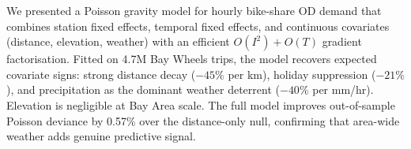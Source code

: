 \documentclass[conference,10pt]{IEEEtran}
\begin{document}
We presented a Poisson gravity model for hourly bike-share OD demand
that combines station fixed effects, temporal fixed effects, and
continuous covariates (distance, elevation, weather) with an efficient
$O(I^2)+O(T)$ gradient factorisation.  Fitted on 4.7M Bay Wheels trips,
the model recovers expected covariate signs: strong distance decay
($-45\%$ per km), holiday suppression ($-21\%$), and precipitation as
the dominant weather deterrent ($-40\%$ per mm/hr).  Elevation is
negligible at Bay Area scale.  The full model improves out-of-sample
Poisson deviance by 0.57\% over the distance-only null, confirming
that area-wide weather adds genuine predictive signal.

\printbibliography
\end{document}
